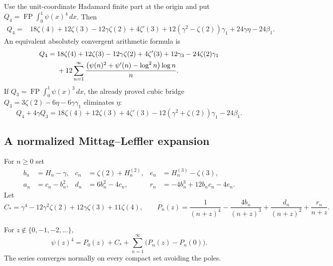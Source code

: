 \begin{theorem}
\label{bhr:quartic-harmonic:main}
Use the unit-coordinate Hadamard finite part at the origin and put
$Q_4=\operatorname{FP}\int_0^1\psi(x)^4\,dx$. Then
\begin{align}
 Q_4={}&18\zeta(4)+12\zeta(3)-12\gamma\zeta(2)+4\zeta'(3)
       +12(\gamma^2-\zeta(2))\gamma_1
       +24\gamma\eta-24\beta_1.
       \label{bhr:quartic-harmonic:main-eq}
\end{align}
An equivalent absolutely convergent arithmetic formula is
\begin{align}
 Q_4={}&18\zeta(4)+12\zeta(3)-12\gamma\zeta(2)+4\zeta'(3)
          +12\gamma_3-24\zeta(2)\gamma_1\notag\\
 &+12\sum_{n=1}^{\infty}
       \frac{\bigl(\psi(n)^2+\psi'(n)-\log^2 n\bigr)\log n}{n}.
       \label{bhr:quartic-harmonic:arithmetic}
\end{align}
If $Q_3=\operatorname{FP}\int_0^1\psi(x)^3\,dx$, the already proved
cubic bridge \cite{bhr:Cubic} $Q_3=3\zeta(2)-6\eta-6\gamma\gamma_1$ eliminates $\eta$:
\begin{equation}
 Q_4+4\gamma Q_3
   =18\zeta(4)+12\zeta(3)+4\zeta'(3)
       -12(\gamma^2+\zeta(2))\gamma_1-24\beta_1.
       \label{bhr:quartic-harmonic:combined}
\end{equation}
\end{theorem}

\subsection{A normalized Mittag--Leffler expansion}

For $n\ge0$ set
\begin{align*}
 b_n&=H_n-\gamma,& c_n&=\zeta(2)+H_n^{(2)},&
 e_n&=H_n^{(3)}-\zeta(3),\\
 a_n&=c_n-b_n^2,& d_n&=6b_n^2-4c_n,&
 r_n&=-4b_n^3+12b_nc_n-4e_n.
\end{align*}
Let
\[
 C_* =\gamma^4-12\gamma^2\zeta(2)+12\gamma\zeta(3)+11\zeta(4),
 \qquad
 P_n(z)=\frac1{(n+z)^4}-\frac{4b_n}{(n+z)^3}
          +\frac{d_n}{(n+z)^2}+\frac{r_n}{n+z}.
\]

\begin{lemma}
\label{bhr:quartic-harmonic:ML}
For $z\notin\{0,-1,-2,\ldots\}$,
\begin{equation}
 \psi(z)^4=P_0(z)+C_*+
     \sum_{n=1}^{\infty}\bigl(P_n(z)-P_n(0)\bigr).
     \label{bhr:quartic-harmonic:ML-eq}
\end{equation}
The series converges normally on every compact set avoiding the poles.
\end{lemma}

